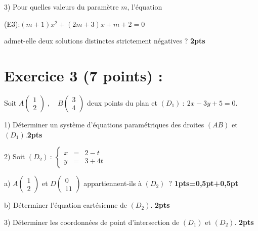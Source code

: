\documentclass[12pt]{article}
\begin{document}
3) Pour quelles valeurs du paramètre \( m \), l'équation
 
(E3):\( (m + 1)x^2 + (2m + 3)x + m + 2 = 0 \) 

admet-elle deux solutions distinctes strictement négatives ? \textbf{2pts}
\section*{Exercice 3 (7 points) :}
Soit $A\begin{pmatrix} 1 \\ 2\end{pmatrix}\;,\quad B\begin{pmatrix} 3 \\ 4\end{pmatrix}$ deux points du plan et $(D_{1})\ :\ 2x-3y+5=0.$

1) Déterminer un système d'équations paramétriques des droites $(AB)$ et $(D_{1}).$\textbf{2pts}

2) Soit $(D_{2})\ :\ \left\lbrace\begin{array}{rcl} x&=&2-t \\ y&=&3+4t\end{array}\right.$

a) $A\begin{pmatrix} 1 \\ 2\end{pmatrix}$ et $D\begin{pmatrix} 0 \\ 11\end{pmatrix}$ appartiennent-ils à $(D_{2})\;\ ?$ \textbf{1pts=0,5pt+0,5pt}

b) Déterminer l'équation cartésienne de $(D_{2})$. \textbf{2pts}

3) Déterminer les coordonnées de point d'intersection de $(D_{1})$ et $(D_{2})$. \textbf{2pts}
\end{document}
